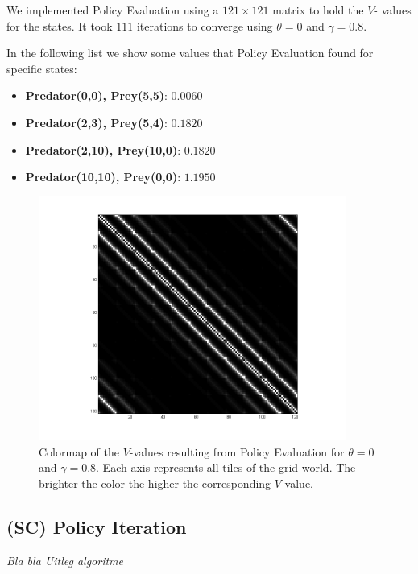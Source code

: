 \documentclass{article}
\begin{document}
We implemented Policy Evaluation using a $121 \times 121$ matrix to hold the $V$- values for the states. 
It took $111$ iterations to converge using $\theta = 0$ and $\gamma = 0.8$.

In the following list we show some values that Policy Evaluation found for specific states:
\begin{itemize}\label{list:policyEvaluationListValues}
\item{\textbf{Predator(0,0), Prey(5,5)}}: $0.0060$		
\item{\textbf{Predator(2,3), Prey(5,4)}}: $0.1820$
\item{\textbf{Predator(2,10), Prey(10,0)}}: $0.1820$
\item{\textbf{Predator(10,10), Prey(0,0)}}: $1.1950$
\end{itemize}


\begin{figure}[htb]\label{colormapPolicyEvaluation}
		\centering
        \includegraphics[width=0.9\textwidth]{VMatrixPolicyEvaluation.png}
        \caption{	 Colormap of the $V$-values resulting from Policy Evaluation for
        			 $\theta=0$ and $\gamma = 0.8$. \newline
        			 Each axis represents all tiles of the grid world.
        			 The brighter the color the higher the corresponding $V$-value.}        
\end{figure}


\subsection{(SC) Policy Iteration}
\emph{Bla bla Uitleg algoritme} \\
\end{document}
